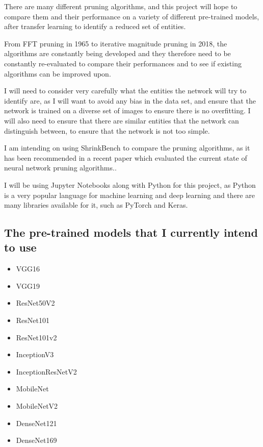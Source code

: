 \documentclass{article}
\begin{document}
There are many different pruning algorithms, and this project will hope to compare
them and their performance on a variety of different pre-trained models, after
transfer learning to identify a reduced set of entities.

From FFT pruning in 1965\cite{FFT} to iterative magnitude pruning in 2018\cite{LotteryTicket},
the algorithms are constantly being developed and they therefore need to be constantly re-evaluated
to compare their performances and to see if existing algorithms can be improved upon.

I will need to consider very carefully what the entities the network will try
to identify are, as I will want to avoid any bias in the data set, and
ensure that the network is trained on a diverse set of images to ensure there is no
overfitting. I will also need to ensure that there are similar entities that the
network can distinguish between, to ensure that the network is not too simple.

I am intending on using ShrinkBench\cite{ShrinkBench} to compare the pruning algorithms,
as it has been recommended in a recent paper which evaluated the current state of neural network pruning algorithms.\cite{DBLP:journals/corr/abs-2003-03033}.

I will be using Jupyter Notebooks\cite{Jupyter} along with Python for this project, as 
Python is a very popular language for machine learning and deep learning and there are many
libraries available for it, such as PyTorch\cite{PyTorch} and Keras\cite{Keras}.

\pagebreak

\subsection{The pre-trained models that I currently intend to use}
\begin{itemize}
	\item VGG16
	\item VGG19
	\item ResNet50V2
	\item ResNet101
	\item ResNet101v2
	\item InceptionV3
	\item InceptionResNetV2
	\item MobileNet
	\item MobileNetV2
	\item DenseNet121
	\item DenseNet169
\end{itemize}
\end{document}

